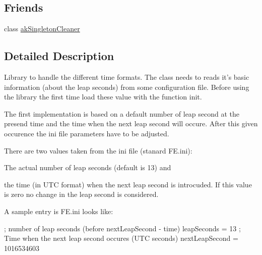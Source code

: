 \subsection*{Friends}
\begin{DoxyCompactItemize}
\item 
class \hyperlink{classakTimeLib_aa7613c42aff93f7383b7f7298e0957b9}{ak\-Singleton\-Cleaner}
\end{DoxyCompactItemize}


\subsection{Detailed Description}
Library to handle the different time formats. The class needs to reads it's basic information (about the leap seconds) from some configuration file. Before using the library the first time load these value with the function init.

The first implementation is based on a default number of leap second at the presend time and the time when the next leap second will occure. After this given occurence the ini file parameters have to be adjusted.

There are two values taken from the ini file (stanard F\-E.\-ini)\-: \begin{DoxyItemize}
\item The actual number of leap seconds (default is 13) and \item the time (in U\-T\-C format) when the next leap second is introcuded. If this value is zero no change in the leap second is considered.\end{DoxyItemize}
A sample entry is F\-E.\-ini looks like\-: 
\begin{DoxyPre}
[GPSTime]
; number of leap seconds (before nextLeapSecond - time)
leapSeconds = 13
; Time when the next leap second occures (UTC seconds)
nextLeapSecond = 1016534603
\end{DoxyPre}
 

